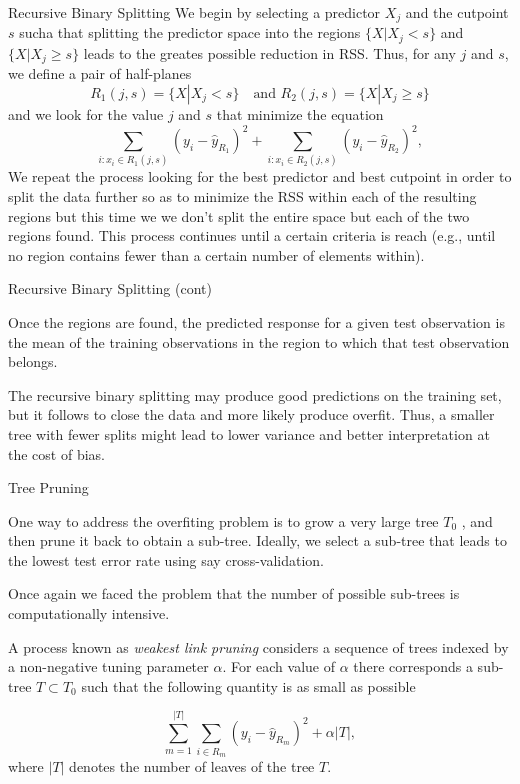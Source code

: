 \documentclass{beamer}
\begin{document}
\begin{frame}{Recursive Binary Splitting}
	We begin by selecting a predictor $X_j$ and the cutpoint $s$ sucha that splitting the predictor space into the regions $\{ X| X_j <s \}$ and $\{ X | X_j \ge s\}$ leads to the greates possible reduction in RSS. Thus, for any $j$ and $s$, we define a pair of half-planes
	\begin{equation*}
		R_1(j,s)= \{ X | X_j <s\} \quad \textrm{and } R_2(j,s)= \{X| X_j\ge s\}
	\end{equation*}
and we look for the value $j$ and $s$ that minimize the equation
\begin{equation}
	\sum_{i: x_i \in R_1(j,s)} (y_i - \hat{y}_{R_1})^2 + 	\sum_{i: x_i \in R_2(j,s)} (y_i - \hat{y}_{R_2})^2 ,
\end{equation}
We repeat the process looking for the best predictor and best cutpoint in order to split the data further so as to minimize the RSS within each of the resulting regions but this time we we don't split the entire space but each of the two regions found. This process continues until a certain criteria is reach (e.g., until no region contains fewer than a certain number of elements within). 


\end{frame}

\begin{frame}{Recursive Binary Splitting (cont)}

Once the regions are found, the predicted response for a given test observation is the mean of the training observations in the region to which that test observation belongs.

The recursive binary splitting may produce good predictions on the training set, but it follows to close the data and more likely produce overfit. Thus, a smaller tree with fewer splits might lead to lower variance and better interpretation at the cost of bias.
\end{frame}

\begin{frame}{Tree Pruning}
	
	
	One way to address the overfiting problem is to grow a very large tree $T_0$ , and then prune it back to obtain a sub-tree. Ideally, we select a sub-tree that leads to the lowest test error rate using say cross-validation. 
	
	Once again we faced the  problem that the number of possible sub-trees is computationally intensive.
	
	A process known as {\it weakest link pruning} considers a sequence of trees indexed by a non-negative tuning parameter $\alpha$. For each value of $\alpha$ there corresponds a sub-tree $T \subset T_0$ such that the following quantity is as small as possible
	
	\begin{equation}
		\sum_{m=1}^{|T|} \sum_{i\in R_m} (y_i -\hat{y}_{R_m})^2 + \alpha |T|,
	\end{equation}
	 where $|T|$ denotes the number of leaves of the tree $T$.
\end{frame}
\end{document}
